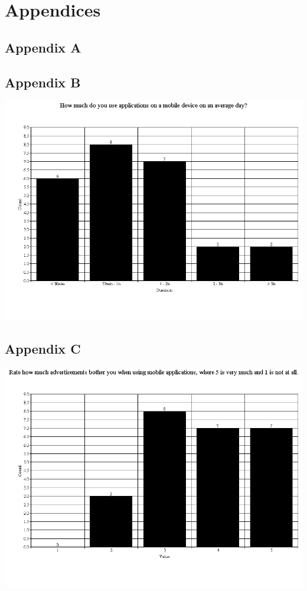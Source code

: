 \chapter{Appendices}

\appendix{}
\section{Appendix A}

\section{Appendix B}
\includegraphics[scale=0.5]{Images/q1}
\section{Appendix C}
\includegraphics[scale=0.5]{Images/q2}
